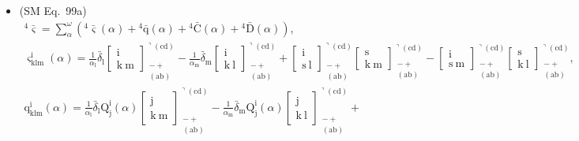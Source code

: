 \documentclass[12pt]{article}
\begin{document}
\begin{itemize}[label={},leftmargin=0pt]
    \item (SM Eq.\ 99a) 
    \[
    \begin{gathered}
    {}^4\bar{\bm{\varsigma}} = \sum_\alpha^\omega \left( {}^4\bar{\bm{\varsigma}}(\alpha) + {}^4\bar{\mathrm{q}}(\alpha) + {}^4\bar{\mathrm{C}}(\alpha) + {}^4\bar{\mathrm{D}}(\alpha) \right), \\
    \varsigma^\mathrm{i}_{\mathrm{klm}}(\alpha) = \frac{1}{\alpha_\mathrm{l}}\bar{\delta}_\mathrm{l} \left[ \begin{smallmatrix} \mathrm{i} \\ \mathrm{k\ m} \end{smallmatrix} \right]^{\urcorner(\mathrm{cd})}_{\substack{- + \\ (\mathrm{ab})}} - \frac{1}{\alpha_\mathrm{m}}\bar{\delta}_\mathrm{m} \left[ \begin{smallmatrix} \mathrm{i} \\ \mathrm{k\ l} \end{smallmatrix} \right]^{\urcorner(\mathrm{cd})}_{\substack{- + \\ (\mathrm{ab})}} + \left[ \begin{smallmatrix} \mathrm{i} \\ \mathrm{s\ l} \end{smallmatrix} \right]^{\urcorner(\mathrm{cd})}_{\substack{- + \\ (\mathrm{ab})}} \left[ \begin{smallmatrix} \mathrm{s} \\ \mathrm{k\ m} \end{smallmatrix} \right]^{\urcorner(\mathrm{cd})}_{\substack{- + \\ (\mathrm{ab})}} - \left[ \begin{smallmatrix} \mathrm{i} \\ \mathrm{s\ m} \end{smallmatrix} \right]^{\urcorner(\mathrm{cd})}_{\substack{- + \\ (\mathrm{ab})}} \left[ \begin{smallmatrix} \mathrm{s} \\ \mathrm{k\ l} \end{smallmatrix} \right]^{\urcorner(\mathrm{cd})}_{\substack{- + \\ (\mathrm{ab})}}, \\
    \mathrm{q}^\mathrm{i}_{\mathrm{klm}}(\alpha) = \frac{1}{\alpha_\mathrm{l}}\bar{\delta}_\mathrm{l} \mathrm{Q}^\mathrm{i}_\mathrm{j}(\alpha) \left[ \begin{smallmatrix} \mathrm{j} \\ \mathrm{k\ m} \end{smallmatrix} \right]^{\urcorner(\mathrm{cd})}_{\substack{- + \\ (\mathrm{ab})}} - \frac{1}{\alpha_\mathrm{m}}\bar{\delta}_\mathrm{m} \mathrm{Q}^\mathrm{i}_\mathrm{j}(\alpha) \left[ \begin{smallmatrix} \mathrm{j} \\ \mathrm{k\ l} \end{smallmatrix} \right]^{\urcorner(\mathrm{cd})}_{\substack{- + \\ (\mathrm{ab})}} + \\

\end{gathered}\]
\end{itemize}
\end{document}
